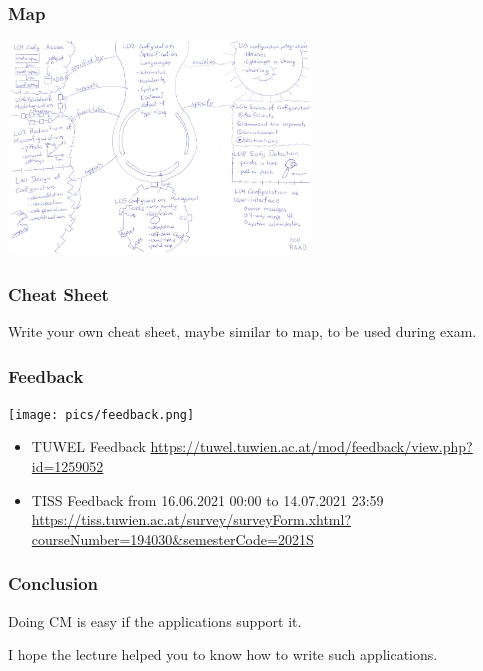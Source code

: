 \begin{frame}
	\frametitle{Map}

	\vspace{-0.5cm}
	\includegraphics[width=8cm]{pics/map.pdf}
\end{frame}

\begin{assignment}
	\frametitle{Cheat Sheet}
	\begin{task}
	Write your own cheat sheet, maybe similar to map, to be used during exam.
	\end{task}
\end{assignment}

\begin{frame}
	\frametitle{Feedback}
	\hfill \texttt{[image: pics/feedback.png]}
	\vspace{-1cm}
	\begin{itemize}
		\item TUWEL Feedback \linebreak
		{\scriptsize \url{https://tuwel.tuwien.ac.at/mod/feedback/view.php?id=1259052}}
		\vspace{0.2cm}
		\item TISS Feedback \linebreak
		{\small from 16.06.2021 00:00 to 14.07.2021 23:59
		\scriptsize \url{https://tiss.tuwien.ac.at/survey/surveyForm.xhtml?courseNumber=194030&semesterCode=2021S}}
	\end{itemize}
\end{frame}

\begin{frame}
	\frametitle{Conclusion}

	Doing CM is easy if the applications support it.
	\vspace{1cm}

	I hope the lecture helped you to know how to write such applications.
\end{frame}




\nocite{raab2017introducing}

\appendix

\begin{frame}[allowframebreaks]
	
	
\end{frame}



